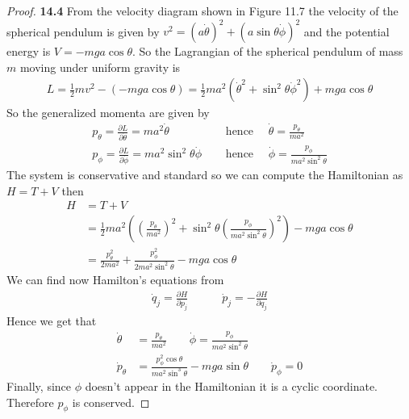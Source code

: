 \documentclass[11pt]{article}
\theoremstyle{definition}
\begin{document}
\cleardoublepage
\begin{proof}{\textbf{14.4}}
    From the velocity diagram shown in Figure 11.7 the velocity of the
    spherical pendulum is given by
    $v^2 = (a\dot\theta)^2 + (a\sin\theta \dot\phi)^2 $
    and the potential energy is $V = -mga\cos\theta$.
    So the Lagrangian of the spherical pendulum of mass $m$ moving
    under uniform gravity is
    \begin{align*}
        L = \frac{1}{2}mv^2 - (-mga\cos\theta)
        = \frac{1}{2}ma^2(\dot\theta^2 + \sin^2\theta \dot\phi^2) + mga\cos\theta
    \end{align*}
    So the generalized momenta are given by
    \begin{align*}
        p_\theta = \frac{\partial L}{\partial \dot{\theta}} = ma^2\dot\theta
        \quad&\text{ hence }\quad \dot \theta = \frac{p_\theta}{ma^2}\\
        p_\phi = \frac{\partial L}{\partial \dot{\phi}} = ma^2\sin^2\theta\dot\phi
        \quad&\text{ hence }\quad \dot \phi = \frac{p_\phi}{ma^2\sin^2\theta}
    \end{align*}
    The system is conservative and standard so we can compute the Hamiltonian
    as $H = T + V$ then
    \begin{align*}
        H &= T + V\\
        &= \frac{1}{2}ma^2\left(
            \left(\frac{p_\theta}{ma^2}\right)^2 +
            \sin^2\theta\left(\frac{p_\phi}{ma^2\sin^2\theta}\right)^2
        \right) - mga\cos\theta\\
        &= \frac{p_\theta^2}{2ma^2}
        + \frac{p_\phi^2}{2ma^2\sin^2\theta}
        - mga\cos\theta
    \end{align*}
    We can find now Hamilton's equations from
    \begin{align*}
        \dot{q}_j = \frac{\partial H}{\partial p_j} \quad\quad\quad
        \dot{p}_j = -\frac{\partial H}{\partial q_j}
    \end{align*}
    Hence we get that
    \begin{align*}
        \dot \theta &= \frac{p_\theta}{ma^2} \quad\quad
        \dot \phi = \frac{p_\phi}{ma^2\sin^2\theta}\\
        \dot p_\theta
        &= \frac{p_\phi^2\cos\theta}{ma^2\sin^3\theta} - mga\sin\theta
        \quad\quad
        \dot p_\phi = 0 
    \end{align*}
    Finally, since $\phi$ doesn't appear in the Hamiltonian it is a
    cyclic coordinate. Therefore $p_\phi$ is conserved.
\end{proof}
\end{document}
